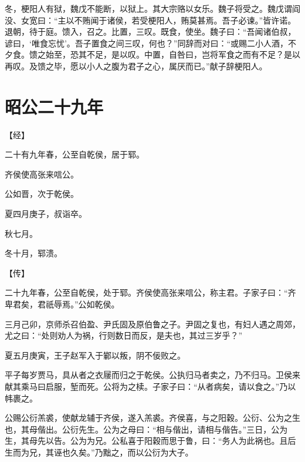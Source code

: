 \documentclass[a4paper,12pt,UTF8,twoside]{ctexbook}
\begin{document}
冬，梗阳人有狱，魏戊不能断，以狱上。其大宗赂以女乐。魏子将受之。魏戊谓阎没、女宽曰：“主以不贿闻于诸侯，若受梗阳人，贿莫甚焉。吾子必谏。”皆许诺。退朝，待于庭。馈入，召之。比置，三叹。既食，使坐。魏子曰：“吾闻诸伯叔，谚曰，‘唯食忘忧’。吾子置食之间三叹，何也？”同辞而对曰：“或赐二小人酒，不夕食。馈之始至，恐其不足，是以叹。中置，自咎曰，岂将军食之而有不足？是以再叹。及馈之毕，愿以小人之腹为君子之心，属厌而已。”献子辞梗阳人。


\section{昭公二十九年}



【经】

二十有九年春，公至自乾侯，居于郓。

齐侯使高张来唁公。

公如晋，次于乾侯。

夏四月庚子，叔诣卒。

秋七月。

冬十月，郓溃。

【传】

二十九年春，公至自乾侯，处于郓。齐侯使高张来唁公，称主君。子家子曰：“齐卑君矣，君祇辱焉。”公如乾侯。

三月己卯，京师杀召伯盈、尹氏固及原伯鲁之子。尹固之复也，有妇人遇之周郊，尤之曰：“处则劝人为祸，行则数日而反，是夫也，其过三岁乎？”

夏五月庚寅，王子赵军入于鄻以叛，阴不佞败之。

平子每岁贾马，具从者之衣屦而归之于乾侯。公执归马者卖之，乃不归马。卫侯来献其乘马曰启服，堑而死。公将为之椟。子家子曰：“从者病矣，请以食之。”乃以帏裹之。

公赐公衍羔裘，使献龙辅于齐侯，遂入羔裘。齐侯喜，与之阳穀。公衍、公为之生也，其母偕出。公衍先生。公为之母曰：“相与偕出，请相与偕告。”三日，公为生，其母先以告。公为为兄。公私喜于阳穀而思于鲁，曰：“务人为此祸也。且后生而为兄，其诬也久矣。”乃黜之，而以公衍为大子。
\end{document}
